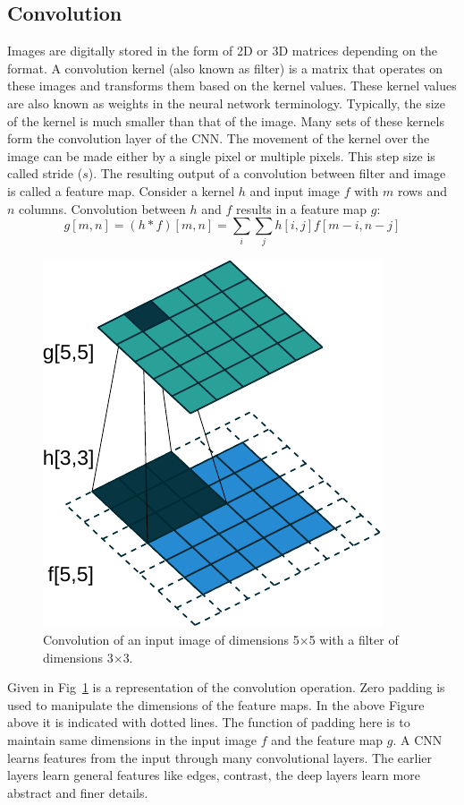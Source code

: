 \subsection{Convolution}

Images are digitally stored in the form of 2D or 3D matrices depending on the format. A convolution kernel (also known as filter) is a matrix that operates on these images and transforms them based on the kernel values. These kernel values are also known as weights in the neural network terminology. Typically, the size of the kernel is much smaller than that of the image. Many sets of these kernels form the convolution layer of the \ac{CNN}.  The movement of the kernel over the image can be made either by a single pixel or multiple pixels. This step size is called stride ($s$). The resulting output of a convolution between filter and image is called a feature map. Consider a kernel $h$ and input image $f$ with $m$ rows and $n$ columns. Convolution between $h$ and $f$ results in a feature map $g$: 
\begin{equation}
g[m, n]=(h * f)[m, n]=\sum_{i} \sum_{j} h[i, j] f[m-i, n-j]
\end{equation}

\begin{figure}[!htbp]
	\centering
	\includegraphics[width=0.4\linewidth]{./Figures/convol-crop.pdf}
	\caption{Convolution of an input image of dimensions 5$\times$5 with a filter of dimensions 3$\times$3.}
	\label{fig:conv}
\end{figure}

Given in Fig~\ref{fig:conv} is a representation of the convolution operation. Zero padding is used to manipulate the dimensions of the feature maps. In the above Figure above it is indicated with dotted lines. The function of padding here is to maintain same dimensions in the input image $f$ and the feature map $g$. A \ac{CNN} learns features from the input through many convolutional layers. The earlier layers learn general features like edges, contrast, the deep layers learn more abstract and finer details.  

